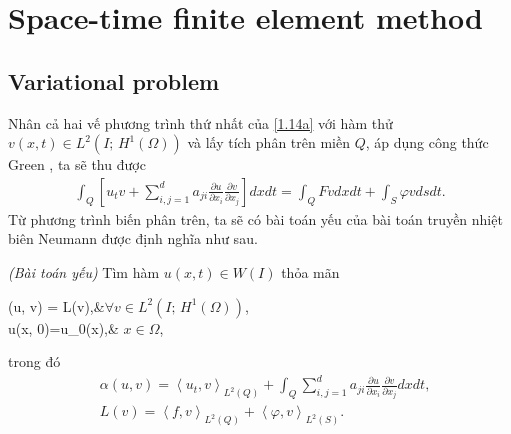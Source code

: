 \documentclass[]{article}
\begin{document}
\section{Space-time finite element method}
\subsection{Variational problem}
\qquad Nhân cả hai vế phương trình thứ nhất của \eqref{1.14a} với hàm thử $v(x, t)\in L^2(I;\, H^1(\Omega))$ và lấy tích phân trên miền $Q$, áp dụng công thức Green \cite{b6}, ta sẽ thu được
\begin{align*}
	\int_{Q}\left[u_tv+\sum_{i, j=1}^{d}a_{ji}\frac{\partial u}{\partial x_i}\frac{\partial v}{\partial x_j}\right]dxdt=\int_{Q}Fvdxdt+\int_{S}\varphi vdsdt.
\end{align*}
Từ phương trình biến phân trên, ta sẽ có bài toán yếu của bài toán truyền nhiệt biên Neumann được định nghĩa như sau.
\begin{dn}{\textit{(Bài toán yếu)}}\label{dn2.1}
	Tìm hàm $u(x, t)\in W(I)$ thỏa mãn
	\begin{subnumcases}{}
		\alpha(u, v) = L(v),&$\forall v\in L^2(I;\, H^1(\Omega))$,\label{2.1a}\\
		u(x, 0)=u_0(x),& $x\in \Omega$, \label{2.1b}
	\end{subnumcases}
	trong đó
	\begin{align*}
		&\alpha(u, v) = \left\langle u_t, v\right\rangle_{L^2(Q)}+\int_{Q}\sum_{i, j=1}^{d}a_{ji}\frac{\partial u}{\partial x_i}\frac{\partial v}{\partial x_j}dxdt,\\
		&L(v)=\left\langle f, v\right\rangle_{L^2(Q)}+\left\langle \varphi, v\right\rangle_{L^2(S)}.
	\end{align*}
\end{dn}
\end{document}
